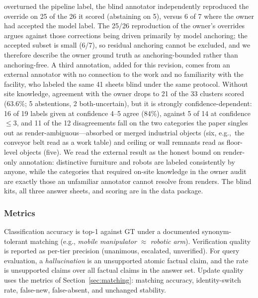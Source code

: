 \documentclass[electronics,article,accept,pdftex,moreauthors]{Definitions/mdpi}
\begin{document}
overturned the pipeline label, the blind annotator independently
reproduced the override on 25 of the 26 it scored (abstaining on 5),
versus 6 of 7 where the owner had accepted the model label. The 25/26 reproduction of the owner's overrides argues against those
corrections being driven primarily by model anchoring; the accepted
subset is small (6/7), so residual anchoring cannot be excluded, and we
therefore describe the owner ground truth as anchoring-bounded rather
than anchoring-free. A third annotation, added for this revision, comes
from an external annotator with no connection to the work and no
familiarity with the facility, who labeled the same 41 sheets blind
under the same protocol. Without site knowledge, agreement with the
owner drops to 21 of the 33 clusters scored (63.6\%; 5 abstentions, 2
both-uncertain), but it is strongly confidence-dependent: 16 of 19
labels given at confidence 4--5 agree (84\%), against 5 of 14 at
confidence $\leq$3, and 11 of the 12 disagreements fall on the two
categories the paper singles out as render-ambiguous---absorbed or
merged industrial objects (six, e.g.,\ the conveyor belt read as a work
table) and ceiling or wall remnants read as floor-level objects (five).
We read the external
result as the honest bound on render-only annotation: distinctive
furniture and robots are labeled consistently by anyone, while the
categories that required on-site knowledge in the owner audit are
exactly those an unfamiliar annotator cannot resolve from renders. The
blind kits, all three answer sheets,
and scoring are in the data package.


\subsubsection{Metrics}
Classification accuracy is top-1 against GT under a documented
synonym-tolerant matching (e.g., \emph{mobile manipulator} $\approx$
\emph{robotic arm}). Verification quality is reported as per-tier precision
(unanimous, escalated, unverified). For query evaluation, a
\emph{hallucination} is an unsupported atomic factual claim, and the rate is
unsupported claims over all factual claims in the answer set. Update quality
uses the metrics of Section~\ref{sec:matching}: matching accuracy,
identity-switch rate, false-new, false-absent, and unchanged stability.
\end{document}
